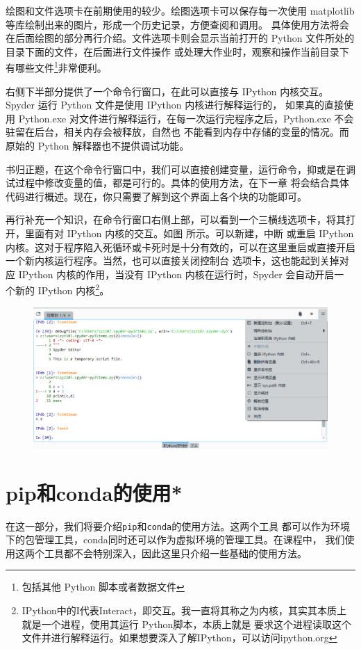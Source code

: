 绘图和文件选项卡在前期使用的较少。绘图选项卡可以保存每一次使用 matplotlib 等库绘制出来的图片，形成一个历史记录，方便查阅和调用。
具体使用方法将会在后面绘图的部分再行介绍。文件选项卡则会显示当前打开的 Python 文件所处的目录下面的文件，在后面进行文件操作
或处理大作业时，观察和操作当前目录下有哪些文件\footnote{包括其他 Python 脚本或者数据文件}非常便利。

右侧下半部分提供了一个命令行窗口，在此可以直接与 IPython 内核交互。Spyder 运行 Python 文件是使用 IPython 内核进行解释运行的，
如果真的直接使用 Python.exe 对文件进行解释运行，在每一次运行完程序之后，Python.exe 不会驻留在后台，相关内存会被释放，自然也
不能看到内存中存储的变量的情况。而原始的 Python 解释器也不提供调试功能。

书归正题，在这个命令行窗口中，我们可以直接创建变量，运行命令，抑或是在调试过程中修改变量的值，都是可行的。具体的使用方法，在下一章
将会结合具体代码进行概述。现在，你只需要了解到这个界面上各个块的功能即可。

再行补充一个知识，在命令行窗口右侧上部，可以看到一个三横线选项卡，将其打开，里面有对 IPython 内核的交互。如图 所示。可以新建，中断
或重启 IPython 内核。这对于程序陷入死循环或卡死时是十分有效的，可以在这里重启或直接开启一个新内核运行程序。当然，也可以直接关闭控制台
选项卡，这也能起到关掉对应 IPython 内核的作用，当没有 IPython 内核在运行时，Spyder 会自动开启一
个新的 IPython 内核\footnote{IPython中的I代表Interact，即交互。我一直将其称之为内核，其实其本质上就是一个进程，使用其运行 Python脚本，本质上就是
要求这个进程读取这个文件并进行解释运行。如果想要深入了解IPython，可以访问ipython.org}。
\begin{figure}[htbp]
    \centering
    \includegraphics[width=0.8\linewidth]{pic/ipython_interact.png}
\end{figure}

\section{pip和conda的使用*}
在这一部分，我们将要介绍\texttt{pip}和\texttt{conda}的使用方法。这两个工具
都可以作为环境下的包管理工具，conda同时还可以作为虚拟环境的管理工具。在课程中，
我们使用这两个工具都不会特别深入，因此这里只介绍一些基础的使用方法。

